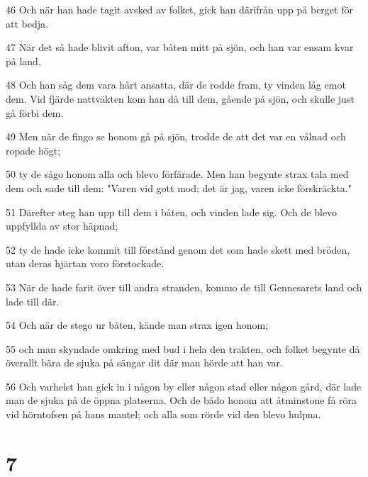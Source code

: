 \par 46 Och när han hade tagit avsked av folket, gick han därifrån upp på berget för att bedja.
\par 47 När det så hade blivit afton, var båten mitt på sjön, och han var ensam kvar på land.
\par 48 Och han såg dem vara hårt ansatta, där de rodde fram, ty vinden låg emot dem. Vid fjärde nattväkten kom han då till dem, gående på sjön, och skulle just gå förbi dem.
\par 49 Men när de fingo se honom gå på sjön, trodde de att det var en vålnad och ropade högt;
\par 50 ty de sågo honom alla och blevo förfärade. Men han begynte strax tala med dem och sade till dem: "Varen vid gott mod; det är jag, varen icke förskräckta."
\par 51 Därefter steg han upp till dem i båten, och vinden lade sig. Och de blevo uppfyllda av stor häpnad;
\par 52 ty de hade icke kommit till förstånd genom det som hade skett med bröden, utan deras hjärtan voro förstockade.
\par 53 När de hade farit över till andra stranden, kommo de till Gennesarets land och lade till där.
\par 54 Och när de stego ur båten, kände man strax igen honom;
\par 55 och man skyndade omkring med bud i hela den trakten, och folket begynte då överallt bära de sjuka på sängar dit där man hörde att han var.
\par 56 Och varhelst han gick in i någon by eller någon stad eller någon gård, där lade man de sjuka på de öppna platserna. Och de bådo honom att åtminstone få röra vid hörntofsen på hans mantel; och alla som rörde vid den blevo hulpna.

\chapter{7}

